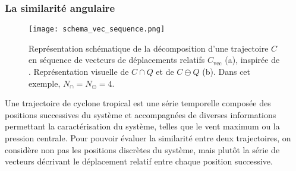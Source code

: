 \documentclass[../main.tex]{subfiles}
\begin{document}
\subsubsection*{La similarité angulaire}

\begin{figure}[htbp]
    \centering
    \texttt{[image: schema\_vec\_sequence.png]}
    \caption{Représentation schématique de la décomposition d'une trajectoire $C$ en séquence de vecteurs de déplacements relatifs $C_{\text{vec}}$ (a),
    inspirée de \textcite{nakamura_shapebased_2013}. Représentation visuelle de $C \cap Q$ et de $C \ominus Q$ (b). Dans cet exemple, $N_\cap = N_\ominus = 4$.}
    \label{fig:schema_trajectoires}
\end{figure}

Une trajectoire de cyclone tropical est une série temporelle composée des positions successives du système et accompagnées de diverses informations permettant
la caractérisation du système, telles que le vent maximum ou la pression centrale. Pour pouvoir évaluer la similarité entre deux trajectoires, on considère non
pas les positions discrètes du système, mais plutôt la série de vecteurs décrivant le déplacement relatif entre chaque position successive.
\end{document}
